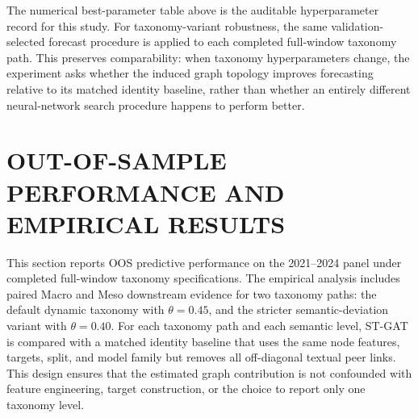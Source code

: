 \documentclass[11pt, a4paper]{article}
\begin{document}
\begin{table}[H]
\centering
\caption{Optuna search space and final hyperparameters.}
\label{tab:hyperparameters}
\vspace{0.2cm}
\renewcommand{\arraystretch}{1.25}
\end{table}

The numerical best-parameter table above is the auditable hyperparameter record for this study. For taxonomy-variant robustness, the same validation-selected forecast procedure is applied to each completed full-window taxonomy path. This preserves comparability: when taxonomy hyperparameters change, the experiment asks whether the induced graph topology improves forecasting relative to its matched identity baseline, rather than whether an entirely different neural-network search procedure happens to perform better.

\section{OUT-OF-SAMPLE PERFORMANCE AND EMPIRICAL RESULTS}
This section reports OOS predictive performance on the 2021--2024 panel under completed full-window taxonomy specifications. The empirical analysis includes paired Macro and Meso downstream evidence for two taxonomy paths: the default dynamic taxonomy with $\theta=0.45$, and the stricter semantic-deviation variant with $\theta=0.40$. For each taxonomy path and each semantic level, ST-GAT is compared with a matched identity baseline that uses the same node features, targets, split, and model family but removes all off-diagonal textual peer links. This design ensures that the estimated graph contribution is not confounded with feature engineering, target construction, or the choice to report only one taxonomy level.
\end{document}
